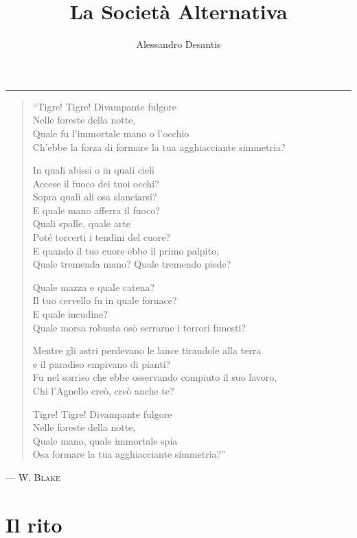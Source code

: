 \documentclass[a4paper,11pt,oneside,openright,final]{memoir}
\title{La Società Alternativa}
\author{Alessandro Desantis}
\makeatletter
\renewcommand{\maketitle}{\begin{titlingpage}%
    \let\footnotesize\small
    \let\footnoterule\relax
    \parindent \z@
    \reset@font
    \null\vfil
    \begin{flushleft}
      \huge \@title
    \end{flushleft}
    \par
    \hrule height 1pt
    \par
    \begin{flushright}
      \LARGE \@author \par
    \end{flushright}
    \vskip 60\p@
    \vfil\null
  \end{titlingpage}%
  \setcounter{footnote}{0}%
}
\makeatother
\begin{document}
\pagestyle{plain}

\maketitle

\clearpage
\thispagestyle{empty}

\begin{verse}
\itshape{
``Tigre! Tigre! Divampante fulgore\\
Nelle foreste della notte,\\
Quale fu l'immortale mano o l'occhio\\
Ch'ebbe la forza di formare la tua agghiacciante simmetria?

In quali abissi o in quali cieli\\
Accese il fuoco dei tuoi occhi?\\
Sopra quali ali osa slanciarsi?\\
E quale mano afferra il fuoco?\\
Quali spalle, quale arte\\
Poté torcerti i tendini del cuore?\\
E quando il tuo cuore ebbe il primo palpito,\\
Quale tremenda mano? Quale tremendo piede?

Quale mazza e quale catena?\\
Il tuo cervello fu in quale fornace?\\
E quale incudine?\\
Quale morsa robusta osò serrarne i terrori funesti?

Mentre gli astri perdevano le lance tirandole alla terra\\
e il paradiso empivano di pianti?\\
Fu nel sorriso che ebbe osservando compiuto il suo lavoro,\\
Chi l'Agnello creò, creò anche te?

Tigre! Tigre! Divampante fulgore\\
Nelle foreste della notte,\\
Quale mano, quale immortale spia\\
Osa formare la tua agghiacciante simmetria?''
\/}
\end{verse}

\begin{flushright}
--- \scshape{W. Blake}
\end{flushright}

\chapter{Il rito}
\end{document}
